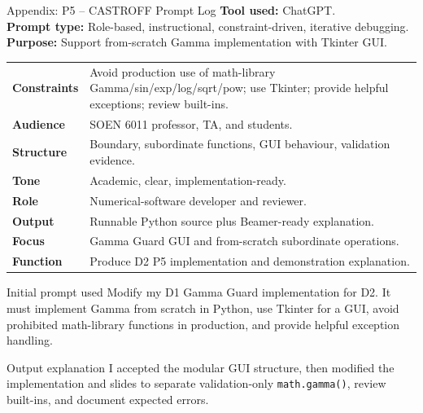 \documentclass[10pt,aspectratio=169]{beamer}
\newcommand{\smallnote}[1]{\vspace{0.2em}{\scriptsize\textcolor{linegray}{#1}}}
\begin{document}
\appendix

\begin{frame}{Appendix: P5 -- CASTROFF Prompt Log}
\tiny
\textbf{Tool used:} ChatGPT.\\
\textbf{Prompt type:} Role-based, instructional, constraint-driven, iterative debugging.\\
\textbf{Purpose:} Support from-scratch Gamma implementation with Tkinter GUI.
\vspace{0.35em}
\begin{tabularx}{\textwidth}{>{\bfseries}p{1.45cm}X}
Constraints & Avoid production use of math-library Gamma/sin/exp/log/sqrt/pow; use Tkinter; provide helpful exceptions; review built-ins.\\
Audience & SOEN 6011 professor, TA, and students.\\
Structure & Boundary, subordinate functions, GUI behaviour, validation evidence.\\
Tone & Academic, clear, implementation-ready.\\
Role & Numerical-software developer and reviewer.\\
Output & Runnable Python source plus Beamer-ready explanation.\\
Focus & Gamma Guard GUI and from-scratch subordinate operations.\\
Function & Produce D2 P5 implementation and demonstration explanation.\\
\end{tabularx}
\begin{block}{Initial prompt used}
Modify my D1 Gamma Guard implementation for D2. It must implement Gamma from scratch in Python, use Tkinter for a GUI, avoid prohibited math-library functions in production, and provide helpful exception handling.
\end{block}
\begin{block}{Output explanation}
I accepted the modular GUI structure, then modified the implementation and slides to separate validation-only \texttt{math.gamma()}, review built-ins, and document expected errors.
\end{block}
\vfill\smallnote{Source: [6].}
\end{frame}
\end{document}
